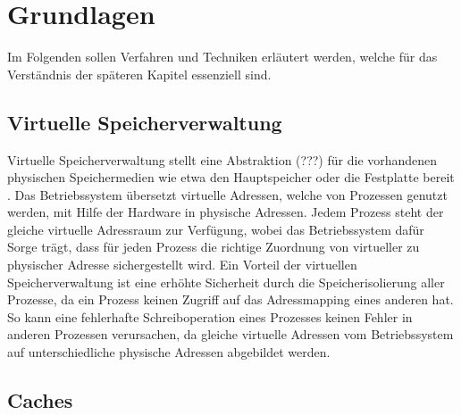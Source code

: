 \chapter{Grundlagen}
\label{chapter:basics}

Im Folgenden sollen Verfahren und Techniken erläutert werden, welche für das Verständnis der späteren Kapitel essenziell sind.  


\section{Virtuelle Speicherverwaltung}

Virtuelle Speicherverwaltung stellt eine Abstraktion (???) für die vorhandenen physischen Speichermedien wie etwa den Hauptspeicher oder die Festplatte bereit \cite{tanenbaumVirtualMemory}.
Das Betriebssystem übersetzt virtuelle Adressen, welche von Prozessen genutzt werden, mit Hilfe der Hardware in physische Adressen. 
Jedem Prozess steht der gleiche virtuelle Adressraum zur Verfügung, wobei das Betriebssystem dafür Sorge trägt, dass für jeden Prozess die richtige Zuordnung von virtueller zu physischer Adresse sichergestellt wird.
Ein Vorteil der virtuellen Speicherverwaltung ist eine erhöhte Sicherheit durch die Speicherisolierung aller Prozesse, da ein Prozess keinen Zugriff auf das Adressmapping eines anderen hat.
So kann eine fehlerhafte Schreiboperation eines Prozesses keinen Fehler in anderen Prozessen verursachen, da gleiche virtuelle Adressen vom Betriebssystem auf unterschiedliche physische Adressen abgebildet werden.

\section{Caches}


